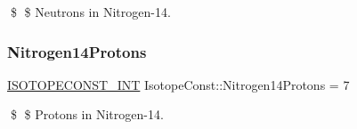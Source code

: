 \$ \$ Neutrons in Nitrogen-\/14. \mbox{\label{group___isotope_const-_nitrogen-_n14_gac3099927646006e549a82912c48e999e}} 
\subsubsection{\texorpdfstring{Nitrogen14\+Protons}{Nitrogen14Protons}}
{\footnotesize\ttfamily \mbox{\hyperlink{group___isotope_const-_macros_ga5f18360b3e99483a35c32d789e62621c}{I\+S\+O\+T\+O\+P\+E\+C\+O\+N\+S\+T\+\_\+\+I\+NT}} Isotope\+Const\+::\+Nitrogen14\+Protons = 7}

\$ \$ Protons in Nitrogen-\/14. 